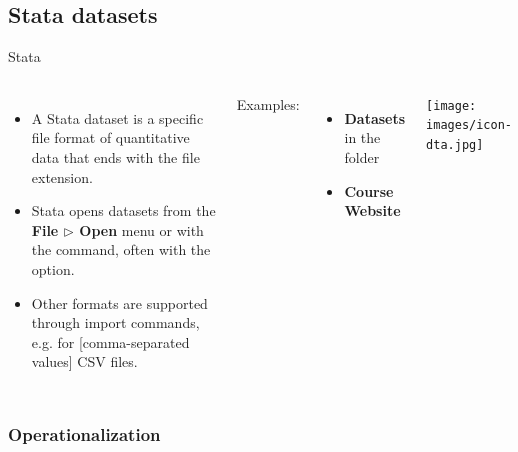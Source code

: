 \documentclass{beamer}
\begin{document}
	\subsection{Stata datasets}

	\begin{frame}[t]{Stata }
		\begin{columns}[T]
			\begin{itemize}
				\item A Stata dataset is a specific file format of quantitative data that ends with the  file extension.
				
				\item Stata opens datasets from the \textbf{File $\triangleright$ Open} menu or with the  command, often with the  option.
				
				\item Other formats are supported through import commands, e.g.  for [comma-separated values] CSV files.
			\end{itemize}
						
			Examples:
			
			\begin{itemize}
				\item \textbf{Datasets} in the  folder

				\item \textbf{Course Website}		
			\end{itemize}
			
			\texttt{[image: images/icon-dta.jpg]}
		\end{columns}
	\end{frame}
	
	\subsubsection{Operationalization}
\end{document}
